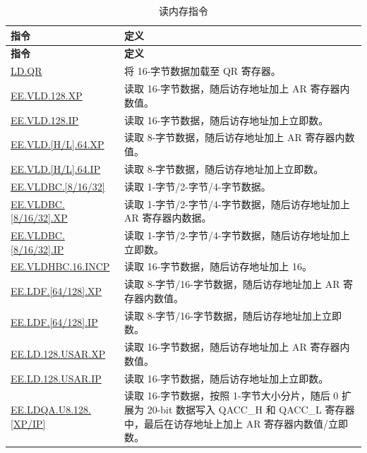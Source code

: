 \begin{longtable}[c]{|l|m{12cm}|}
    \caption{读内存指令}
    \label{tab:pie-load-instructions}\\
    \hline
    \rowcolor{lightgray}
    \textbf{指令} & \textbf{定义} \\\hline
    \endfirsthead
    \rowcolor{lightgray}
    \textbf{指令} & \textbf{定义} \\\hline
    \endhead
    \endfoot
    
    \hyperref[instruction:LDQR]{LD.QR} & 将 16-字节数据加载至 QR 寄存器。
    \\\hline
    \hyperref[instruction:EEVLD128XP]{EE.VLD.128.XP} & 读取 16-字节数据，随后访存地址加上 AR 寄存器内数值。
    \\\hline
    \hyperref[instruction:EEVLD128IP]{EE.VLD.128.IP} & 读取 16-字节数据，随后访存地址加上立即数。
    \\\hline
    \hyperref[instruction:EEVLDH64XP]{EE.VLD.[H/L].64.XP} & 读取 8-字节数据，随后访存地址加上 AR 寄存器内数值。
    \\\hline
    \hyperref[instruction:EEVLDH64IP]{EE.VLD.[H/L].64.IP} & 读取 8-字节数据，随后访存地址加上立即数。
    \\\hline
    \hyperref[instruction:EEVLDBC8]{EE.VLDBC.[8/16/32]} & 读取 1-字节/2-字节/4-字节数据。
    \\\hline
    \hyperref[instruction:EEVLDBC8XP]{EE.VLDBC.[8/16/32].XP} & 读取 1-字节/2-字节/4-字节数据，随后访存地址加上 AR 寄存器内数据。
    \\\hline
    \hyperref[instruction:EEVLDBC8IP]{EE.VLDBC.[8/16/32].IP} & 读取 1-字节/2-字节/4-字节数据，随后访存地址加上立即数。
    \\\hline
    \hyperref[instruction:EEVLDHBC16INCP]{EE.VLDHBC.16.INCP} & 读取 16-字节数据，随后访存地址加上 16。
    \\\hline
    \hyperref[instruction:EELDF64XP]{EE.LDF.[64/128].XP} & 读取 8-字节/16-字节数据，随后访存地址加上 AR 寄存器内数值。
    \\\hline
    \hyperref[instruction:EELDF64IP]{EE.LDF.[64/128].IP} & 读取 8-字节/16-字节数据，随后访存地址加上立即数。
    \\\hline
    \hyperref[instruction:EELD128USARXP]{EE.LD.128.USAR.XP} & 读取 16-字节数据，随后访存地址加上 AR 寄存器内数值。
    \\\hline
    \hyperref[instruction:EELD128USARIP]{EE.LD.128.USAR.IP} & 读取 16-字节数据，随后访存地址加上立即数。
    \\\hline
    \hyperref[instruction:EELDQAU8128XP]{EE.LDQA.U8.128.[XP/IP]} & 读取 16-字节数据，按照 1-字节大小分片，随后 0 扩展为 20-bit 数据写入 QACC\_H 和 QACC\_L 寄存器中，最后在访存地址上加上 AR 寄存器内数值/立即数。

\end{longtable}
